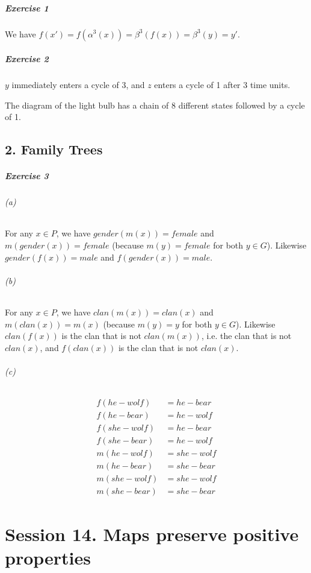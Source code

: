 \documentclass{report}
\begin{document}
    \paragraph{Exercise 1}
    We have $f(x') = f(\alpha^3(x)) = \beta^3(f(x)) = \beta^3(y) = y'$.

    \paragraph{Exercise 2}
    $y$ immediately enters a cycle of 3, and $z$ enters a cycle of 1 after 3 time units.

    The diagram of the light bulb has a chain of 8 different states followed by a cycle of 1.

    \section{2. Family Trees}

    \paragraph{Exercise 3}
    \subparagraph{(a)}
    For any $x \in P$, we have $gender(m(x)) = female$ and $m(gender(x)) = female$ (because $m(y) = female$
    for both $y \in G$). Likewise $gender(f(x)) = male$ and $f(gender(x)) = male$.

    \subparagraph{(b)}
    For any $x \in P$, we have $clan(m(x)) = clan(x)$ and $m(clan(x)) = m(x)$ (because $m(y) = y$ for both
    $y \in G$). Likewise $clan(f(x))$ is the clan that is not $clan(m(x))$, i.e. the clan that is not $clan(x)$,
    and $f(clan(x))$ is the clan that is not $clan(x)$.

    \subparagraph{(c)}
    \begin{align*}
        f(he-wolf) & = he-bear \\
        f(he-bear) & = he-wolf \\
        f(she-wolf) & = he-bear \\
        f(she-bear) & = he-wolf \\
        m(he-wolf) & = she-wolf \\
        m(he-bear) & = she-bear \\
        m(she-wolf) & = she-wolf \\
        m(she-bear) & = she-bear
    \end{align*}

    \chapter{Session 14. Maps preserve positive properties}
\end{document}
